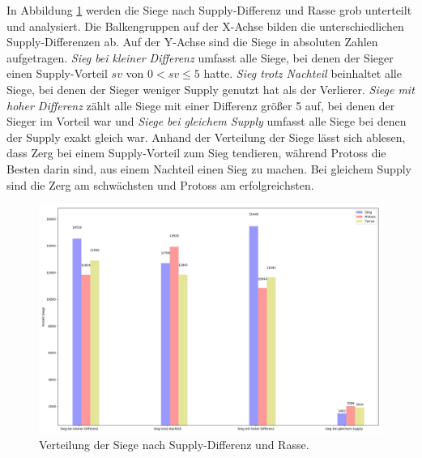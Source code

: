 In Abbildung \ref{fig:siegsupp} werden die Siege nach Supply-Differenz und Rasse grob unterteilt und analysiert. Die Balkengruppen auf der X-Achse bilden die unterschiedlichen Supply-Differenzen ab. Auf der Y-Achse sind die Siege in absoluten  Zahlen aufgetragen. \textit{Sieg bei kleiner Differenz} umfasst alle Siege, bei denen der Sieger einen Supply-Vorteil $sv$ von $ 0 < sv \leq 5$ hatte. \textit{Sieg trotz Nachteil} beinhaltet alle Siege, bei denen der Sieger weniger Supply genutzt hat als der Verlierer. \textit{Siege mit hoher Differenz} zählt alle Siege mit einer Differenz größer 5 auf, bei denen der Sieger im Vorteil war und \textit{Siege bei gleichem Supply} umfasst alle Siege bei denen der Supply exakt gleich war. Anhand der Verteilung der Siege lässt sich ablesen, dass Zerg bei einem Supply-Vorteil zum Sieg tendieren, während Protoss die Besten darin sind, aus einem Nachteil einen Sieg zu machen. Bei gleichem Supply sind die Zerg am schwächsten und Protoss am erfolgreichsten. 


\begin{figure}[ht]
\centering
\includegraphics[scale=0.3]{pictures/Graph_Supp_Wins}
\caption{Verteilung der Siege nach Supply-Differenz und Rasse.}
\label{fig:siegsupp}
\end{figure}

